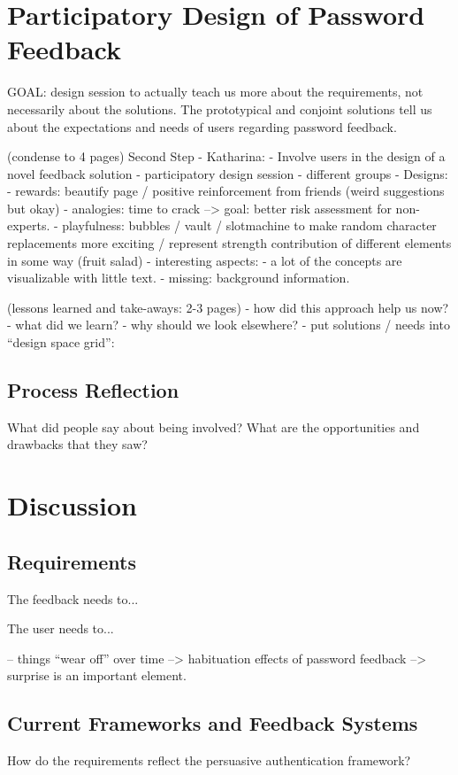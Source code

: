 \section{Participatory Design of Password Feedback}
GOAL: design session to actually teach us more about the requirements, not necessarily about the solutions. The prototypical and conjoint solutions tell us about the expectations and needs of users regarding password feedback. 

(condense to 4 pages)
Second Step - Katharina: 
- Involve users in the design of a novel feedback solution
	- participatory design session
	- different groups
- Designs:
	- rewards: beautify page / positive reinforcement from friends (weird suggestions but okay)
	- analogies: time to crack --> goal: better risk assessment for non-experts.
	- playfulness: bubbles / vault / slotmachine to make random character replacements more exciting / represent strength contribution of different elements in some way (fruit salad)
- interesting aspects:
	- a lot of the concepts are visualizable with little text.
	- missing: background information.
	
(lessons learned and take-aways: 2-3 pages)
- how did this approach help us now?
- what did we learn?
- why should we look elsewhere?
- put solutions / needs into ``design space grid'':



\subsection{Process Reflection}
What did people say about being involved? What are the opportunities and drawbacks that they saw?
	
\section{Discussion}

\subsection{Requirements}
The feedback needs to...

The user needs to...

-- things ``wear off'' over time --> habituation effects of password feedback --> surprise is an important element. 

\subsection{Current Frameworks and Feedback Systems}
How do the requirements reflect the persuasive authentication framework?

